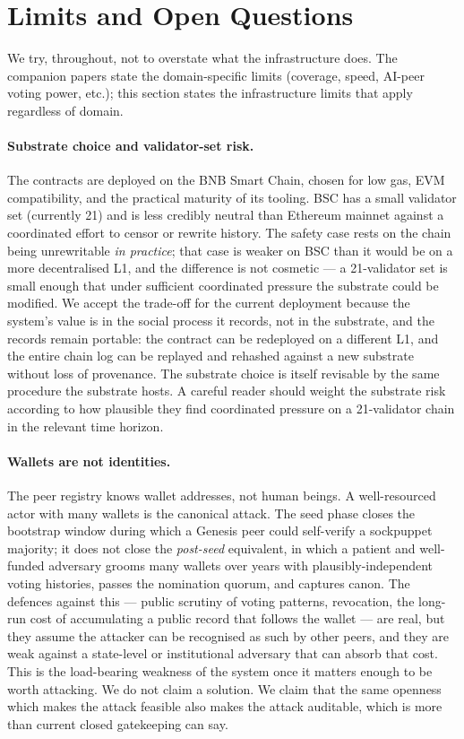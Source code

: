 \documentclass[11pt,a4paper]{article}
\begin{document}
\section{Limits and Open Questions}

We try, throughout, not to overstate what the infrastructure
does. The companion papers state the domain-specific limits
(coverage, speed, AI-peer voting power, etc.); this section
states the infrastructure limits that apply regardless of
domain.

\paragraph{Substrate choice and validator-set risk.} The
contracts are deployed on the BNB Smart Chain, chosen for low
gas, EVM compatibility, and the practical maturity of its
tooling. BSC has a small validator set (currently 21) and is
less credibly neutral than Ethereum mainnet against a
coordinated effort to censor or rewrite history. The safety
case rests on the chain being unrewritable \emph{in practice};
that case is weaker on BSC than it would be on a more
decentralised L1, and the difference is not cosmetic --- a
21-validator set is small enough that under sufficient
coordinated pressure the substrate could be modified. We
accept the trade-off for the current deployment because the
system's value is in the social process it records, not in the
substrate, and the records remain portable: the contract can
be redeployed on a different L1, and the entire chain log can
be replayed and rehashed against a new substrate without loss
of provenance. The substrate choice is itself revisable by the
same procedure the substrate hosts. A careful reader should
weight the substrate risk according to how plausible they find
coordinated pressure on a 21-validator chain in the relevant
time horizon.

\paragraph{Wallets are not identities.} The peer registry knows
wallet addresses, not human beings. A well-resourced actor
with many wallets is the canonical attack. The seed phase
closes the bootstrap window during which a Genesis peer could
self-verify a sockpuppet majority; it does not close the
\emph{post-seed} equivalent, in which a patient and well-funded
adversary grooms many wallets over years with
plausibly-independent voting histories, passes the nomination
quorum, and captures canon. The defences against this --- public
scrutiny of voting patterns, revocation, the long-run cost of
accumulating a public record that follows the wallet --- are
real, but they assume the attacker can be recognised as such
by other peers, and they are weak against a state-level or
institutional adversary that can absorb that cost. This is the
load-bearing weakness of the system once it matters enough to
be worth attacking. We do not claim a solution. We claim that
the same openness which makes the attack feasible also makes
the attack auditable, which is more than current closed
gatekeeping can say.
\end{document}
